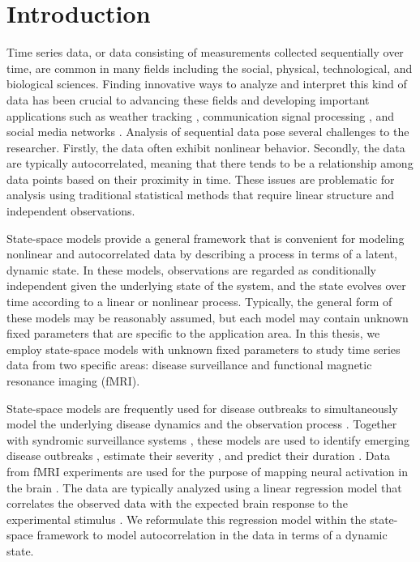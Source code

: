 \chapter{Introduction}

Time series data, or data consisting of measurements collected sequentially over time, are common in many fields including the social, physical, technological, and biological sciences. Finding innovative ways to analyze and interpret this kind of data has been crucial to advancing these fields and developing important applications such as weather tracking \citep{dixon:wiener:weather:1993}, communication signal processing \citep{gardner:signal:1994}, and social media networks \citep{smith:social:2009}. Analysis of sequential data pose several challenges to the researcher. Firstly, the data often exhibit nonlinear behavior. Secondly, the data are typically autocorrelated, meaning that there tends to be a relationship among data points based on their proximity in time. These issues are problematic for analysis using traditional statistical methods that require linear structure and independent observations.

State-space models provide a general framework that is convenient for modeling nonlinear and autocorrelated data by describing a process in terms of a latent, dynamic state. In these models, observations are regarded as conditionally independent given the underlying state of the system, and the state evolves over time according to a linear or nonlinear process. Typically, the general form of these models may be reasonably assumed, but each model may contain unknown fixed parameters that are specific to the application area. In this thesis, we employ state-space models with unknown fixed parameters to study time series data from two specific areas: disease surveillance and functional magnetic resonance imaging (fMRI).

State-space models are frequently used for disease outbreaks to simultaneously model the underlying disease dynamics and the observation process \citep{Mart:Cone:Lope:Lope:baye:2008, merl2009statistical, ludkovski2010optimal, skvortsov2012monitoring, unkel2012statistical}. Together with syndromic surveillance systems \citep{henning2004overview, wagner2006biosurveillance, wilson2006synsurveillance, hakenewerth2009north, Gins:Mohe:Pate:Bram:Smol:Bril:dete:2009}, these models are used to identify emerging disease outbreaks \citep{neill2006bayesian}, estimate their severity \citep{merl2009statistical}, and predict their duration \cite{ludkovski2010optimal}. Data from fMRI experiments are used for the purpose of mapping neural activation in the brain \citep{ashby:fmri:2011,kiebel:holmes:spm:2007,pold:fmri:2011}. The data are typically analyzed using a linear regression model that correlates the observed data with the expected brain response to the experimental stimulus \citep{friston:frith:JCBFM:1991,friston:holmes:hbm:1995}. We reformulate this regression model within the state-space framework to model autocorrelation in the data in terms of a dynamic state.

